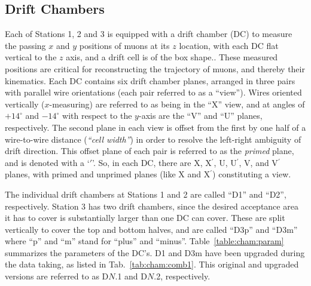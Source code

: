\subsection{Drift Chambers}

Each of Stations 1, 2 and 3 is equipped with a drift chamber (DC) to measure the passing $x$ and $y$ positions of muons at its $z$ location, with each DC flat vertical to the $z$ axis, and a drift cell is of the box shape.. These measured positions are critical for reconstructing the trajectory of muons, and thereby their kinematics. Each DC contains six drift chamber planes, arranged in three pairs with parallel wire orientations (each pair referred to as a ``view''). Wires oriented vertically ($x$-measuring) are referred to as being in the ``X'' view, and at angles of $+14^\circ$ and $-14^\circ$ with respect to the $y$-axis are the ``V'' and ``U'' planes, respectively. The second plane in each view is offset from the first by one half of a wire-to-wire distance (\emph{``cell width''}) in order to resolve the left-right ambiguity of drift direction. This offset plane of each pair is referred to as the \emph{primed} plane, and is denoted with a `$\prime$'. So, in each DC, there are X, X$^\prime$, U, U$^\prime$, V, and V$^\prime$ planes, with primed and unprimed planes (like X and X$^\prime$) constituting a view.

The individual drift chambers at Stations 1 and 2 are called ``D1'' and ``D2'', respectively. Station 3 has two drift chambers, since the desired acceptance area it has to cover is substantially larger than one DC can cover. These are split vertically to cover the top and bottom halves, and are called ``D3p'' and ``D3m'' where ``p'' and ``m'' stand for ``plus'' and ``minus''. Table~\ref{table:cham:param} summarizes the parameters of the DC's. D1 and D3m have been upgraded during the data taking, as listed in Tab.~\ref{tab:cham:comb1}. This original and upgraded versions are referred to as D$N$.1 and D$N$.2, respectively.

